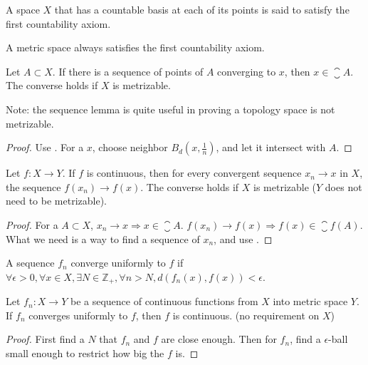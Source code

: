 \begin{definition}\label{first_countability_axiom}
    A space $X$ that has a countable basis at each of its points is said to satisfy the first countability axiom. 
    
    A metric space always satisfies the first countability axiom.
\end{definition}

\begin{theorem}
    Let $A \subset X$. If there is a sequence of points of $A$ converging to $x$, then $x \in \closure{A}$. The converse holds if $X$ is metrizable.
    
    Note: the sequence lemma is quite useful in proving a topology space is not metrizable.
\end{theorem}
\begin{proof}
    Use . For a $x$, choose neighbor $B_d(x, \frac{1}{n})$, and let it intersect with $A$.
\end{proof}


\begin{theorem}
    Let $f: X \rightarrow Y$. If $f$ is continuous, then for every convergent sequence $x_n \rightarrow x$ in $X$, the sequence $f(x_n) \rightarrow f(x)$. The converse holds if $X$ is metrizable ($Y$ does not need to be metrizable).
\end{theorem}
\begin{proof}
    For a $A \subset X$,  $x_n \rightarrow x \Rightarrow x \in \closure{A}$. $f(x_n) \rightarrow f(x) \Rightarrow f(x) \in \closure{f(A)}$. What we need is a way to find a sequence of $x_n$, and use .
\end{proof}




\begin{definition}
    A sequence $f_n$ converge uniformly to $f$ if $\forall \epsilon > 0,\forall x \in X, \exists N \in \mathbb{Z}_{+}, \forall n > N, d \left( f_n (x) , f(x) \right) < \epsilon$.
\end{definition}

\begin{theorem}
    Let $f_n: X \rightarrow Y$ be a sequence of continuous functions from $X$ into metric space $Y$. If $f_n$ converges uniformly to $f$, then $f$ is continuous. (no requirement on $X$)
\end{theorem}
\begin{proof}
    First find a $N$ that $f_n$ and $f$ are close enough. Then for $f_n$, find a $\epsilon$-ball small enough to restrict how big the $f$ is.
\end{proof}





